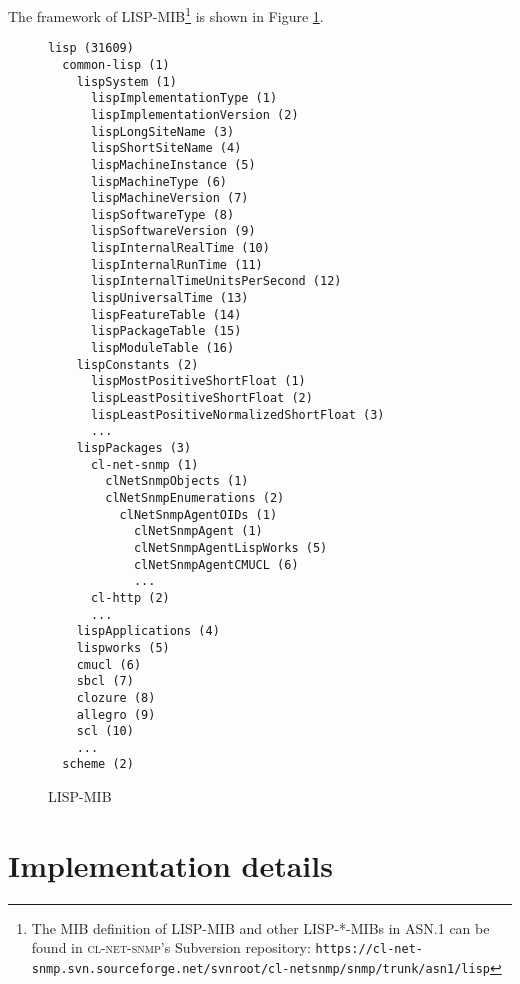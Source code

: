 \documentclass[reprint,natbib,9pt]{sigplanconf}
\begin{document}
The framework of LISP-MIB\footnote{The MIB definition of
  LISP-MIB and other LISP-*-MIBs in ASN.1 can be found in \textsc{cl-net-snmp}'s
  Subversion repository:
  \texttt{https://cl-net-snmp.svn.sourceforge.net/svnroot/cl-net\-snmp/snmp/trunk/asn1/lisp}}
is shown in Figure \ref{fig:lisp-mib}.

\begin{figure}
\begin{verbatim}
lisp (31609)
  common-lisp (1)
    lispSystem (1)
      lispImplementationType (1)
      lispImplementationVersion (2)
      lispLongSiteName (3)
      lispShortSiteName (4)
      lispMachineInstance (5)
      lispMachineType (6)
      lispMachineVersion (7)
      lispSoftwareType (8)
      lispSoftwareVersion (9)
      lispInternalRealTime (10)
      lispInternalRunTime (11)
      lispInternalTimeUnitsPerSecond (12)
      lispUniversalTime (13)
      lispFeatureTable (14)
      lispPackageTable (15)
      lispModuleTable (16)
    lispConstants (2)
      lispMostPositiveShortFloat (1)
      lispLeastPositiveShortFloat (2)
      lispLeastPositiveNormalizedShortFloat (3)
      ...
    lispPackages (3)
      cl-net-snmp (1)
        clNetSnmpObjects (1)
        clNetSnmpEnumerations (2)
          clNetSnmpAgentOIDs (1)
            clNetSnmpAgent (1)
            clNetSnmpAgentLispWorks (5)
            clNetSnmpAgentCMUCL (6)
            ...
      cl-http (2)
      ...
    lispApplications (4)
    lispworks (5)
    cmucl (6)
    sbcl (7)
    clozure (8)
    allegro (9)
    scl (10)
    ...
  scheme (2)
\end{verbatim}  
  \caption{LISP-MIB}
  \label{fig:lisp-mib}
\end{figure}

\section{Implementation details}


\end{document}
